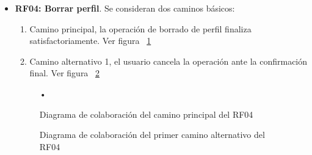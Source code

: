\begin{itemize}
	\FloatBarrier
	\item \textbf{RF04: Borrar perfil}. Se consideran dos caminos básicos: 
	\begin{enumerate}
		\item Camino principal, la operación de borrado de perfil finaliza satisfactoriamente. Ver figura ~\ref{fig:diagramaColaboracion_RF04_1}
		\item Camino alternativo 1, el usuario cancela la operación ante la confirmación final. Ver figura ~\ref{fig:diagramaColaboracion_RF04_2}
	\end{enumerate}
	\begin{figure} [!htb]
		\centering
		•
		\caption{Diagrama de colaboración del camino principal del RF04}
		\label{fig:diagramaColaboracion_RF04_1}
	\end{figure}
	\begin{figure} [!htb]
		\centering
		\caption{Diagrama de colaboración del primer camino alternativo del RF04}
		\label{fig:diagramaColaboracion_RF04_2}
	\end{figure}
	

\end{itemize}
